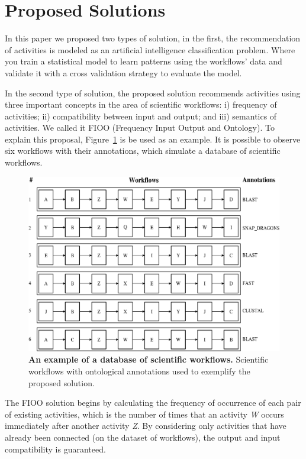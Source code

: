 \documentclass{RITA}
\begin{document}
\section{Proposed Solutions}
In this paper we proposed two types of solution, in the first, the recommendation of activities is modeled as an artificial intelligence classification problem. Where you train a statistical model to learn patterns using the workflows' data and validate it with a cross validation strategy to evaluate the  model.

In the second type of solution, the proposed solution recommends activities using three important concepts in the area of scientific workflows: i) frequency of activities; ii) compatibility between input and output; and iii) semantics of activities. We called it FIOO (Frequency Input Output and Ontology). To explain this proposal, Figure~\ref{FIGURA_ONTOLOGIA_CONSTRUIDA2} is be used as an example. It is possible to observe six workflows with their annotations, which simulate a database of scientific workflows.

\begin{figure}[!htb]
	\centering
	\includegraphics[scale = 0.3]{./pics/recomendacaofreqontologia.eps}
	\caption{{\bf An example of a database of scientific workflows.} Scientific workflows with ontological annotations used to exemplify the proposed solution.}
	\label{FIGURA_ONTOLOGIA_CONSTRUIDA2}
\end{figure}

The FIOO solution begins by calculating the frequency of occurrence of each pair of existing activities, which is the number of times that an activity \emph{W} occurs immediately after another activity \emph{Z}. By considering only activities that have already been connected (on the dataset of workflows), the output and input compatibility is guaranteed.
\end{document}
